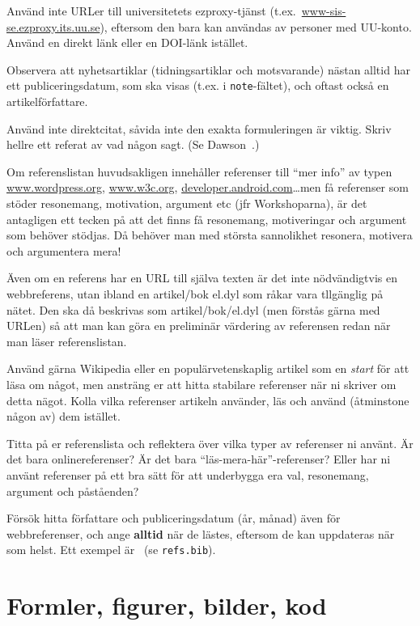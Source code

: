Använd inte URLer till universitetets ezproxy-tjänst (t.ex.~\url{www-sis-se.ezproxy.its.uu.se}), eftersom den bara kan användas av personer med UU-konto. Använd en direkt länk eller en DOI-länk istället.

Observera att nyhetsartiklar (tidningsartiklar och motsvarande) nästan alltid har ett publiceringsdatum, som ska visas (t.ex. i \verb|note|-fältet), och oftast också en artikelförfattare.

Använd inte direktcitat, såvida inte den exakta formuleringen är viktig.  Skriv hellre ett referat av vad någon sagt. (Se Dawson~\cite{dawson:projects-in-computing,dawson:projects-in-computing-old}.)

Om referenslistan huvudsakligen innehåller referenser till ``mer info'' av typen 
\url{www.wordpress.org}, \url{www.w3c.org}, \url{developer.android.com}\ldots men få referenser som stöder resonemang, motivation, argument etc (jfr Workshoparna), är det antagligen ett tecken på att det finns få resonemang, motiveringar och argument som behöver stödjas. Då behöver man med största sannolikhet resonera, motivera och argumentera mera!

Även om en referens har en URL till själva texten är det inte nödvändigtvis en webbreferens, utan ibland en artikel/bok el.dyl som råkar vara tllgänglig på nätet. Den ska då beskrivas som artikel/bok/el.dyl (men förstås gärna med URLen) så att man kan göra en preliminär värdering av referensen redan när man läser referenslistan.

Använd gärna Wikipedia eller en populärvetenskaplig artikel som en \emph{start} för att läsa om något, men ansträng er att hitta stabilare referenser när ni skriver om detta nägot. Kolla vilka referenser artikeln använder, läs och använd (åtminstone någon av) dem istället.

Titta på er referenslista och reflektera över vilka typer av referenser ni använt. Är det bara onlinereferenser? Är det bara ``läs-mera-här''-referenser? Eller har ni använt referenser på ett bra sätt för att underbygga era val, resonemang, argument och påståenden?

Försök hitta författare och publiceringsdatum (år, månad) även för webbreferenser, och ange \textbf{alltid} när de lästes, eftersom de kan uppdateras när som helst. Ett exempel är~\cite{berners-lee:cool-uris} (se \texttt{refs.bib}).



\section{Formler, figurer, bilder, kod}
\label{sec:forml-figur-bild}


